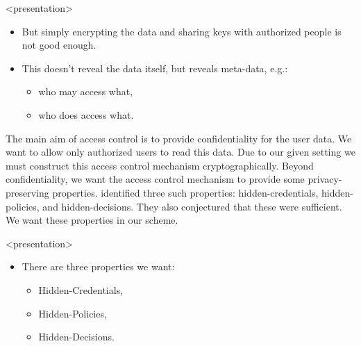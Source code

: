 \begin{frame}<presentation>
  \begin{itemize}

    \item But simply encrypting the data and sharing keys with authorized 
      people is not good enough.

    \item This doesn't reveal the data itself, but reveals meta-data, e.g.:
      \begin{itemize}
        \item who may access what,
        \item who does access what.
      \end{itemize}

  \end{itemize}
\end{frame}

The main aim of access control is to provide confidentiality for the user data.
We want to allow only authorized users to read this data.
Due to our given setting we must construct this access control mechanism 
cryptographically.
Beyond confidentiality, we want the access control mechanism to provide some 
privacy-preserving properties.
\citet{ppac} identified three such properties: hidden-credentials, 
hidden-policies, and hidden-decisions.
They also conjectured that these were sufficient.
We want these properties in our scheme.


\begin{frame}<presentation>
  \begin{itemize}

    \item There are three properties we want:
      \begin{itemize}
        \item Hidden-Credentials,
        \item Hidden-Policies,
        \item Hidden-Decisions.
      \end{itemize}

  \end{itemize}
\end{frame}

%
%
%
%

